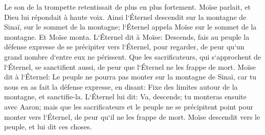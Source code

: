 \verse Le son de la trompette retentissait de plus en plus fortement. Moïse parlait, et Dieu lui répondait à haute voix. 
\verse Ainsi l`Éternel descendit sur la montagne de Sinaï, sur le sommet de la montagne; l`Éternel appela Moïse sur le sommet de la montagne. Et Moïse monta. 
\verse L`Éternel dit à Moïse: Descends, fais au peuple la défense expresse de se précipiter vers l`Éternel, pour regarder, de peur qu`un grand nombre d`entre eux ne périssent. 
\verse Que les sacrificateurs, qui s`approchent de l`Éternel, se sanctifient aussi, de peur que l`Éternel ne les frappe de mort. 
\verse Moïse dit à l`Éternel: Le peuple ne pourra pas monter sur la montagne de Sinaï, car tu nous en as fait la défense expresse, en disant: Fixe des limites autour de la montagne, et sanctifie-la. 
\verse L`Éternel lui dit: Va, descends; tu monteras ensuite avec Aaron; mais que les sacrificateurs et le peuple ne se précipitent point pour monter vers l`Éternel, de peur qu`il ne les frappe de mort. 
\verse Moïse descendit vers le peuple, et lui dit ces choses. 

\chapter{}

